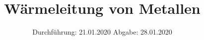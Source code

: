 

\subject{V204}
\title{Wärmeleitung von Metallen}
\date{%
  Durchführung: 21.01.2020
  \hspace{3em}
  Abgabe: 28.01.2020
}



\maketitle
\thispagestyle{empty}
\tableofcontents
\newpage








\printbibliography{}


